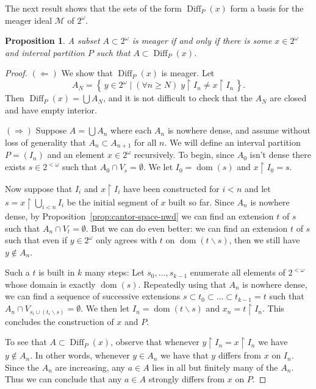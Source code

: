 \documentclass[11pt,oneside]{amsbook}
\newcommand{\set}[1]{\left\{\,#1\,\right\}}
\DeclareMathOperator{\dom}{dom}
\DeclareMathOperator{\Diff}{Diff}
\theoremstyle{definition}
\theoremstyle{plain}
\newtheorem{proposition}[theorem]{Proposition}
\theoremstyle{definition}
\theoremstyle{remark}
\numberwithin{equation}{section}
\numberwithin{figure}{section}
\begin{document}
The next result shows that the sets of the form $\Diff_P(x)$ form a basis for the meager ideal $\mathcal M$ of $2^\omega$.

\begin{proposition}
  \label{prop:meager-diff}
  A subset $A\subset2^\omega$ is meager if and only if there is some $x\in2^\omega$ and interval partition $P$ such that $A\subset\Diff_P(x)$.
\end{proposition}

\begin{proof}
  $(\Leftarrow)$ We show that $\Diff_P(x)$ is meager. Let
  \[A_N=\set{y\in2^\omega\mid(\forall n\geq N)\;y\restriction I_n\neq x\restriction I_n}\text{.}
  \]
  Then $\Diff_P(x)=\bigcup A_N$, and it is not difficult to check that the $A_N$ are closed and have empty interior.

  $(\Rightarrow)$ Suppose $A=\bigcup A_n$ where each $A_n$ is nowhere dense, and assume without loss of generality that $A_n\subset A_{n+1}$ for all $n$. We will define an interval partition $P=(I_n)$ and an element $x\in2^\omega$ recursively. To begin, since $A_0$ isn't dense there exists $s\in2^{<\omega}$ such that $A_0\cap V_s=\emptyset$. We let $I_0=\dom(s)$ and $x\restriction I_0=s$.

  Now suppose that $I_i$ and $x\restriction I_i$ have been constructed for $i<n$ and let $s=x\restriction\bigcup_{i<n}I_i$ be the initial segment of $x$ built so far. Since $A_n$ is nowhere dense, by Proposition~\ref{prop:cantor-space-nwd} we can find an extension $t$ of $s$ such that $A_n\cap V_t=\emptyset$. But we can do even better: we can find an extension $t$ of $s$ such that even if $y\in2^\omega$ only agrees with $t$ on $\dom(t\smallsetminus s)$, then we still have $y\notin A_n$.

  Such a $t$ is built in $k$ many steps: Let $s_0,\ldots,s_{k-1}$ enumerate all elements of $2^{<\omega}$ whose domain is exactly $\dom(s)$. Repeatedly using that $A_n$ is nowhere dense, we can find a sequence of successive extensions $s\subset t_0\subset\ldots\subset t_{k-1}=t$ such that $A_n\cap V_{s_i\cup(t_i\smallsetminus s)}=\emptyset$. We then let $I_n=\dom(t\smallsetminus s)$ and $x_n=t\restriction I_n$. This concludes the construction of $x$ and $P$.

  To see that $A\subset\Diff_P(x)$, observe that whenever $y\restriction I_n=x\restriction I_n$ we have $y\notin A_n$. In other words, whenever $y\in A_n$ we have that $y$ differs from $x$ on $I_n$. Since the $A_n$ are increasing, any $a\in A$ lies in all but finitely many of the $A_n$. Thus we can conclude that any $a\in A$ strongly differs from $x$ on $P$.
\end{proof}
\end{document}
